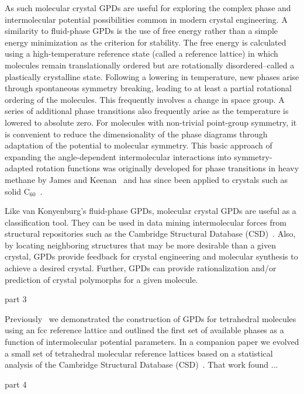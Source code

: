 \documentclass[preprint]{revtex4}
\begin{document}
As such molecular crystal GPDs are useful for exploring the complex phase and intermolecular potential possibilities common in modern crystal engineering. A similarity to fluid-phase GPDs is the use of free energy rather than a simple energy minimization as the criterion for stability. The free energy is calculated using a high-temperature reference state (called a reference lattice) in which molecules remain translationally ordered but are rotationally disordered--called a plastically crystalline state.  Following a lowering in temperature, new phases arise through spontaneous symmetry breaking, leading to at least a partial rotational ordering of the molecules.  This frequently involves a change in space group.  A series of additional phase transitions also frequently arise as the temperature is lowered to absolute zero. For molecules with non-trivial point-group symmetry, it is convenient to reduce the dimensionality of the phase diagrams through adaptation of the potential to molecular symmetry. This basic approach of expanding the angle-dependent intermolecular interactions into symmetry-adapted rotation functions was originally developed for phase transitions in heavy methane by James and Keenan~\cite{James95} and has since been applied to crystals such as solid C$_{60}$~\cite{Michel92,Lamoen99}. 

Like van Konyenburg's fluid-phase GPDs, molecular crystal GPDs are useful as a classification tool.  They can be used in data mining intermolecular forces from structural repositories such as the Cambridge Structural Database (CSD)~\cite{Allen02}.  Also, by locating neighboring structures that may be more desirable than a given crystal, GPDs provide feedback for crystal engineering and molecular synthesis to achieve a desired crystal. Further, GPDs can provide rationalization and/or prediction of crystal polymorphs for a given molecule.

part 3

Previously~\cite{Mettes04} we demonstrated the construction of GPDs for tetrahedral molecules using an fcc reference lattice and outlined the first set of available phases as a function of intermolecular potential parameters.  In a companion paper\cite{McClurg08} we evolved a small set of tetrahedral molecular reference lattices based on a statistical analysis of the Cambridge Structural Database
(CSD)~\cite{Allen02}.  That work found ...

part 4
\end{document}
